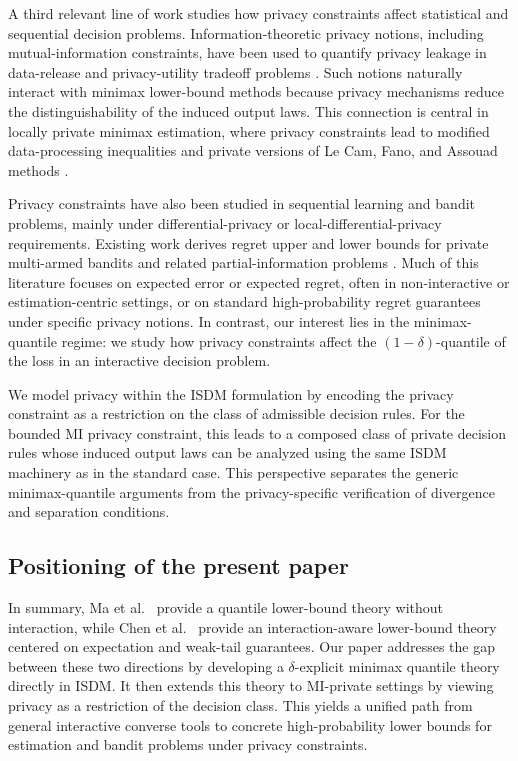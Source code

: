 \documentclass[journal]{IEEEtran}
\begin{document}
A third relevant line of work studies how privacy constraints affect statistical
and sequential decision problems. Information-theoretic privacy notions,
including mutual-information constraints, have been used to quantify privacy
leakage in data-release and privacy-utility tradeoff problems
\cite{zamani2023privacy,zamani2022bounds,sankar2013utility,calmon2015information,diaz2019robustness}. Such notions
naturally interact with minimax lower-bound methods because privacy mechanisms
reduce the distinguishability of the induced output laws. This connection is
central in locally private minimax estimation, where privacy constraints lead to
modified data-processing inequalities and private versions of Le Cam, Fano, and
Assouad methods \cite{duchi2013local,duchi2018minimax,duchi2019lower}.

Privacy constraints have also been studied in sequential learning and bandit
problems, mainly under differential-privacy or local-differential-privacy
requirements. Existing work derives regret upper and lower bounds for private
multi-armed bandits and related partial-information problems
\cite{tossou2016algorithms,basu2019differential,ren2020multi,azize2024concentrated, chen2025decision}.
Much of this literature focuses on expected error or expected regret, often in
non-interactive or estimation-centric settings, or on standard high-probability
regret guarantees under specific privacy notions. In contrast, our interest lies
in the minimax-quantile regime: we study how privacy constraints affect the
\((1-\delta)\)-quantile of the loss in an interactive decision problem.

We model privacy within the ISDM formulation by encoding the privacy constraint
as a restriction on the class of admissible decision rules. For the bounded MI
privacy constraint, this leads to a composed class of private decision rules
whose induced output laws can be analyzed using the same ISDM machinery as in
the standard case. This perspective separates the generic minimax-quantile
arguments from the privacy-specific verification of divergence and separation
conditions.

\subsection{Positioning of the present paper}

In summary, Ma et al.\ \cite{ma2024high} provide a quantile lower-bound theory without interaction, while Chen et al.\ \cite{chen2024assouad} provide an interaction-aware lower-bound theory centered on expectation and weak-tail guarantees. Our paper addresses the gap between these two directions by developing a \(\delta\)-explicit minimax quantile theory directly in ISDM. It then extends this theory to MI-private settings by viewing privacy as a restriction of the decision class. This yields a unified path from general interactive converse tools to concrete high-probability lower bounds for  estimation and bandit problems under privacy constraints.
\end{document}
